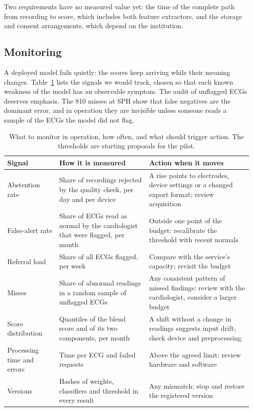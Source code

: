 \documentclass[letterpaper,11pt]{article}
\begin{document}
Two requirements have no measured value yet: the time of the complete path from recording to score, which includes both feature extractors, and the storage and consent arrangements, which depend on the institution.

\subsection{Monitoring}

A deployed model fails quietly: the scores keep arriving while their meaning changes. Table~\ref{tab:monitoring} lists the signals we would track, chosen so that each known weakness of the model has an observable symptom. The audit of unflagged ECGs deserves emphasis. The 810 misses at SPH show that false negatives are the dominant error, and in operation they are invisible unless someone reads a sample of the ECGs the model did not flag.

\begin{table}[!htb]
  \centering
  \caption{What to monitor in operation, how often, and what should trigger action. The thresholds are starting proposals for the pilot.}
  \label{tab:monitoring}
  \small
  \begin{tabular}{p{3.5cm}p{6.3cm}p{5.4cm}}
    \toprule
    Signal & How it is measured & Action when it moves \\
    \midrule
    Abstention rate & Share of recordings rejected by the quality check, per day and per device & A rise points to electrodes, device settings or a changed export format; review acquisition \\
    False-alert rate & Share of ECGs read as normal by the cardiologist that were flagged, per month & Outside one point of the budget: recalibrate the threshold with recent normals \\
    Referral load & Share of all ECGs flagged, per week & Compare with the service's capacity; revisit the budget \\
    Misses & Share of abnormal readings in a random sample of unflagged ECGs & Any consistent pattern of missed findings: review with the cardiologist, consider a larger budget \\
    Score distribution & Quantiles of the blend score and of its two components, per month & A shift without a change in readings suggests input drift; check device and preprocessing \\
    Processing time and errors & Time per ECG and failed requests & Above the agreed limit: review hardware and software \\
    Versions & Hashes of weights, classifiers and threshold in every result & Any mismatch: stop and restore the registered version \\
    \bottomrule
  \end{tabular}
\end{table}
\end{document}
